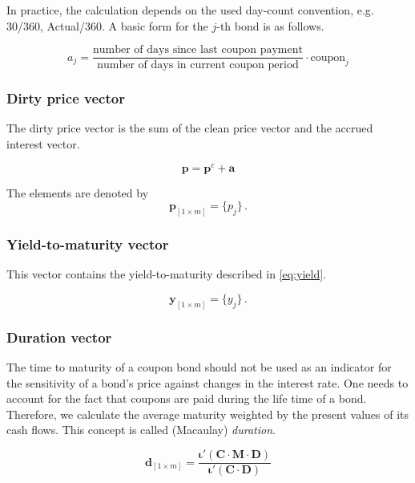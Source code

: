 In practice, the calculation depends on the used day-count convention, e.g. 30/360, Actual/360. A basic form for the $j$-th bond is as follows.

\begin{equation*}
    a_j= \frac{\mbox{number of days since last coupon payment}}{\mbox{number of days in current coupon period}}\cdot \mbox{coupon}_j
\end{equation*}
 	

\subsubsection*{Dirty price vector}

The dirty price vector is the sum of the clean price vector and the accrued interest vector.

\begin{displaymath}
\bm{p}=\bm{p}^c+\bm{a}
\end{displaymath}

The elements are denoted by 
\begin{equation*}\label{pd}
    \bm{p}_{\left[1\times m\right]}= \{p_j\}\,.
\end{equation*}


\subsubsection*{Yield-to-maturity vector}

This vector contains the yield-to-maturity described in \eqref{eq:yield}.

\begin{equation*}\label{pd}
    \bm{y}_{\left[1\times m\right]}= \{y_j\}\,.
\end{equation*}



\subsubsection*{Duration vector}

The time to maturity of a coupon bond should not be used as an indicator for the sensitivity of a bond's price against changes in the interest rate. One needs to account for the fact that coupons are paid during the life time of a bond. Therefore, we calculate the average maturity weighted by the present values of its cash flows. This concept is called (Macaulay) \emph{duration}.

\begin{equation*}
  \label{eq:macaulayduration}
  \bm{d}_{\left[1\times m\right]} = \frac{\bm{\iota}'(\bm{C}\cdot\bm{M}\cdot\bm{D})}{\bm{\iota}'(\bm{C}\cdot\bm{D})}
\end{equation*}


